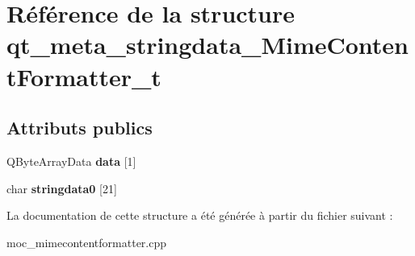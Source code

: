 \hypertarget{structqt__meta__stringdata__MimeContentFormatter__t}{}\section{Référence de la structure qt\+\_\+meta\+\_\+stringdata\+\_\+\+Mime\+Content\+Formatter\+\_\+t}
\label{structqt__meta__stringdata__MimeContentFormatter__t}
\subsection*{Attributs publics}
\begin{DoxyCompactItemize}
\item 
Q\+Byte\+Array\+Data {\bfseries data} \mbox{[}1\mbox{]}\hypertarget{structqt__meta__stringdata__MimeContentFormatter__t_afc95e3d5a16aa1ec02154b74dd68947c}{}\label{structqt__meta__stringdata__MimeContentFormatter__t_afc95e3d5a16aa1ec02154b74dd68947c}

\item 
char {\bfseries stringdata0} \mbox{[}21\mbox{]}\hypertarget{structqt__meta__stringdata__MimeContentFormatter__t_a7052168cf591e4db258ad21ab352fd1d}{}\label{structqt__meta__stringdata__MimeContentFormatter__t_a7052168cf591e4db258ad21ab352fd1d}

\end{DoxyCompactItemize}


La documentation de cette structure a été générée à partir du fichier suivant \+:\begin{DoxyCompactItemize}
\item 
moc\+\_\+mimecontentformatter.\+cpp\end{DoxyCompactItemize}
